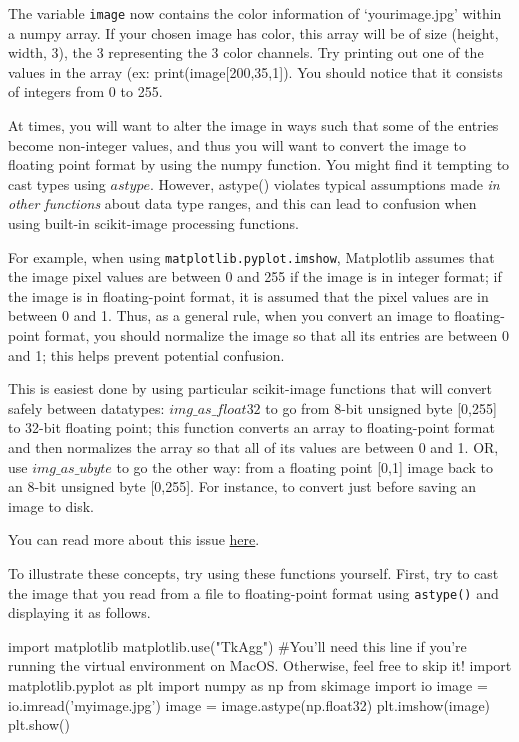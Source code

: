 \documentclass{article}
\begin{document}
The variable \texttt{image} now contains the color information of `yourimage.jpg' within a numpy array. If your chosen image has color, this array will be of size (height, width, 3), the 3 representing the 3 color channels. Try printing out one of the values in the array (ex: print(image[200,35,1]). You should notice that it consists of integers from 0 to 255.

At times, you will want to alter the image in ways such that some of the entries become non-integer values, and thus you will want to convert the image to floating point format by using the numpy function. You might find it tempting to cast types using \href{https://docs.scipy.org/doc/numpy-1.15.0/reference/generated/numpy.ndarray.astype.html}{$astype$}. However, astype() violates typical assumptions made \emph{in other functions} about data type ranges, and this can lead to confusion when using built-in scikit-image processing functions. 

For example, when using \texttt{matplotlib.pyplot.imshow}, Matplotlib assumes that the image pixel values are between 0 and 255 if the image is in integer format; if the image is in floating-point format, it is assumed that the pixel values are in between 0 and 1. Thus, as a general rule, when you convert an image to floating-point format, you should normalize the image so that all its entries are between 0 and 1; this helps prevent potential confusion. 

This is easiest done by using particular scikit-image functions that will convert safely between datatypes:
\href{http://scikit-image.org/docs/dev/api/skimage.html#skimage.img_as_float32}{$img\_as\_float32$} to go from 8-bit unsigned byte [0,255] to 32-bit floating point; this function converts an array to floating-point format and then normalizes the array so that all of its values are between 0 and 1. OR, use \href{http://scikit-image.org/docs/dev/api/skimage.html#skimage.img_as_ubyte}{$img\_as\_ubyte$} to go the other way: from a floating point [0,1] image back to an 8-bit unsigned byte [0,255]. For instance, to convert just before saving an image to disk.

You can read more about this issue \href{http://scikit-image.org/docs/dev/user_guide/data_types.html}{here}.

To illustrate these concepts, try using these functions yourself.
First, try to cast the image that you read from a file to floating-point format using \texttt{astype()} and displaying it as follows.\\
\begin{python}
import matplotlib
matplotlib.use("TkAgg") #You'll need this line if you're running the virtual environment on MacOS. Otherwise, feel free to skip it!
import matplotlib.pyplot as plt
import numpy as np
from skimage import io
image = io.imread('myimage.jpg')
image = image.astype(np.float32)
plt.imshow(image)
plt.show()
\end{python}
\end{document}
